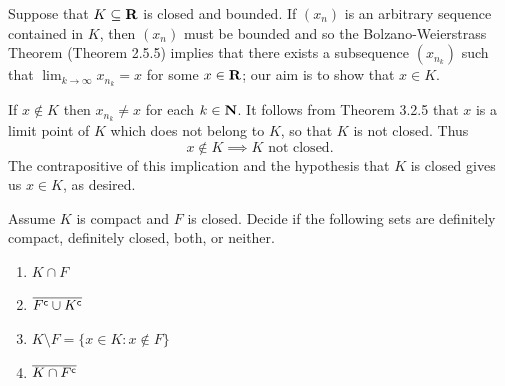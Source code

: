 \documentclass{lew98_solutions}
\begin{document}
\begin{solution}
    Suppose that \( K \subseteq \mathbf{R} \) is closed and bounded. If \( (x_n) \) is an arbitrary sequence contained in \( K \), then \( (x_n) \) must be bounded and so the Bolzano-Weierstrass Theorem (Theorem 2.5.5) implies that there exists a subsequence \( (x_{n_k}) \) such that \( \lim_{k \to \infty} x_{n_k} = x \) for some \( x \in \mathbf{R} \); our aim is to show that \( x \in K \).
    
    If \( x \not\in K \) then \( x_{n_k} \neq x \) for each \( k \in \mathbf{N} \). It follows from Theorem 3.2.5 that \( x \) is a limit point of \( K \) which does not belong to \( K \), so that \( K \) is not closed. Thus
    \[
        x \not\in K \implies K \text{ not closed}.
    \]
    The contrapositive of this implication and the hypothesis that \( K \) is closed gives us \( x \in K \), as desired.
\end{solution}

\begin{exercise}
\label{ex:3.3.4}
    Assume \( K \) is compact and \( F \) is closed. Decide if the following sets are definitely compact, definitely closed, both, or neither.
    \begin{enumerate}
        \item \( K \cap F \)

        \item \( \overline{F^{\mathsf{c}} \cup K^{\mathsf{c}}} \)

        \item \( K \setminus F = \{ x \in K : x \not\in F \} \)

        \item \( \overline{K \cap F^{\mathsf{c}}} \)
    \end{enumerate}
\end{exercise}
\end{document}
